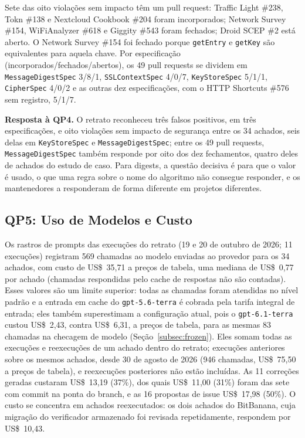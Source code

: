 \documentclass[conference]{IEEEtran}
\newcommand{\researchq}[1]{\textbf{QP#1}}
\begin{document}
Sete das oito violações sem impacto têm um pull request: Traffic
Light \#238, Tokn \#138 e Nextcloud Cookbook \#204 foram incorporados;
Network Survey \#154, WiFiAnalyzer \#618 e Giggity \#543 foram fechados; Droid
SCEP \#2 está aberto. O Network Survey \#154 foi fechado porque \texttt{getEntry}
e \texttt{getKey} são equivalentes para aquela chave. Por especificação (incorporados/fechados/abertos), os 49 pull requests se dividem em
\texttt{MessageDigestSpec} 3/8/1, \texttt{SSLContextSpec} 4/0/7,
\texttt{KeyStoreSpec} 5/1/1, \texttt{CipherSpec} 4/0/2 e as outras dez
especificações, com o HTTP Shortcuts \#576 sem registro, 5/1/7.

\textbf{Resposta à \researchq{4}.} O retrato reconheceu três falsos
positivos, em três especificações, e oito violações sem impacto de
segurança entre os 34 achados, seis delas em \texttt{KeyStoreSpec} e
\texttt{MessageDigestSpec}; entre os 49 pull requests,
\texttt{MessageDigestSpec} também responde por oito dos dez fechamentos, quatro
deles de achados do estudo de caso. Para digests, a
questão decisiva é para que o valor é usado, o que uma regra sobre o
nome do algoritmo não consegue responder, e os mantenedores a responderam de forma diferente em
projetos diferentes.

\subsection{\researchq{5}: Uso de Modelos e Custo}

Os rastros de prompts das execuções do retrato (19 e 20 de outubro de 2026;
11 execuções) registram 569 chamadas ao modelo enviadas ao provedor para os 34 achados,
com custo de US\$~35,71 a preços de tabela, uma mediana de US\$~0,77 por achado
(chamadas respondidas pelo cache de respostas não são contadas). Esses valores
são um limite superior: todas as chamadas foram atendidas no nível padrão e a
entrada em cache do \texttt{gpt-5.6-terra} é cobrada pela tarifa integral de
entrada; eles também superestimam a configuração atual, pois o
\texttt{gpt-6.1-terra} custou US\$~2,43, contra US\$~6,31, a preços de tabela, para as mesmas 83 chamadas na checagem de modelo
(Seção~\ref{subsec:frozen}). Eles somam todas as execuções e reexecuções de um
achado dentro do retrato; execuções anteriores sobre os mesmos achados, desde 30
de agosto de 2026 (946 chamadas, US\$~75,50 a preços de tabela), e reexecuções
posteriores não estão incluídas. As 11 correções geradas custaram
US\$~13,19 (37\%), dos quais US\$~11,00 (31\%) foram das sete com commit na
ponta do branch, e as 16 propostas de issue US\$~17,98 (50\%). O custo se concentra
em achados reexecutados: os dois achados do BitBanana, cuja migração do
verificador armazenado foi revisada repetidamente, respondem por US\$~10,43.
\end{document}

